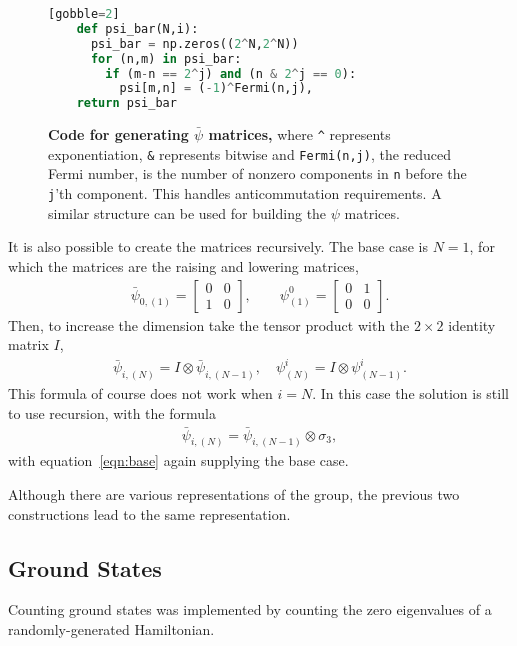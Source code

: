 \documentclass[12pt]{article} %
\begin{document}
\begin{figure}
	\begin{lstlisting}[language=python][gobble=2]
    def psi_bar(N,i):
      psi_bar = np.zeros((2^N,2^N))
      for (n,m) in psi_bar:
        if (m-n == 2^j) and (n & 2^j == 0): 
          psi[m,n] = (-1)^Fermi(n,j),
    return psi_bar
		\end{lstlisting}
	\cprotect\caption{\textbf{Code for generating $\bar \psi$ matrices,} where \verb|^| represents exponentiation, \verb|&| represents bitwise and \verb|Fermi(n,j)|, the reduced Fermi number, is the number of nonzero components in \verb|n| before the \verb|j|'th component. This handles anticommutation requirements. A similar structure can be used for building the $\psi$ matrices.}
	\label{code:psibar}
\end{figure}

It is also possible to create the matrices recursively. The base case is $N=1$, for which the matrices are the raising and lowering matrices,
\begin{align}
\bar\psi_{0,(1)} = \begin{bmatrix} 0&0\\1&0 \end{bmatrix}, \qquad
    \psi^0_{(1)} = \begin{bmatrix} 0&1\\0&0 \end{bmatrix}. \label{eqn:base}
\end{align}
Then, to increase the dimension take the tensor product with the $2\times 2$ identity matrix $I$,
\begin{align}
\bar\psi_{i,(N)} = I\otimes\bar\psi_{i,(N-1)},\quad \psi^i_{(N)} = I\otimes 
	\psi^i_{(N-1)}.
\end{align}
This formula of course does not work when $i=N$. In this case the solution is still to use recursion, with the formula
\begin{align}
\bar\psi_{i,(N)} = \bar\psi_{i,(N-1)}\otimes\sigma_3,
\end{align}
with equation~\ref{eqn:base} again supplying the base case.

Although there are various representations of the group, the previous two constructions lead to the same representation. 

\subsection{Ground States}

Counting ground states was implemented by counting the zero eigenvalues of a randomly-generated Hamiltonian. 

\printbibliography
\end{document}
